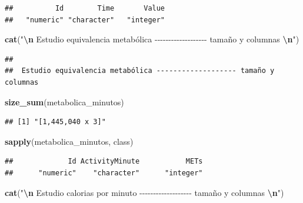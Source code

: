 \documentclass[
]{article}
\newenvironment{Shaded}{\begin{snugshade}}{\end{snugshade}}
\newcommand{\FunctionTok}[1]{\textcolor[rgb]{0.13,0.29,0.53}{\textbf{#1}}}
\newcommand{\NormalTok}[1]{#1}
\newcommand{\SpecialCharTok}[1]{\textcolor[rgb]{0.81,0.36,0.00}{\textbf{#1}}}
\newcommand{\StringTok}[1]{\textcolor[rgb]{0.31,0.60,0.02}{#1}}
\begin{document}
\begin{verbatim}
##          Id        Time       Value 
##   "numeric" "character"   "integer"
\end{verbatim}

\begin{Shaded}
\begin{Highlighting}[]
\FunctionTok{cat}\NormalTok{(}\StringTok{"}\SpecialCharTok{\textbackslash{}n}\StringTok{ Estudio equivalencia metabólica {-}{-}{-}{-}{-}{-}{-}{-}{-}{-}{-}{-}{-}{-}{-}{-}{-}{-}{-} tamaño y columnas }\SpecialCharTok{\textbackslash{}n}\StringTok{"}\NormalTok{)}
\end{Highlighting}
\end{Shaded}

\begin{verbatim}
## 
##  Estudio equivalencia metabólica ------------------- tamaño y columnas
\end{verbatim}

\begin{Shaded}
\begin{Highlighting}[]
\FunctionTok{size\_sum}\NormalTok{(metabolica\_minutos)}
\end{Highlighting}
\end{Shaded}

\begin{verbatim}
## [1] "[1,445,040 x 3]"
\end{verbatim}

\begin{Shaded}
\begin{Highlighting}[]
\FunctionTok{sapply}\NormalTok{(metabolica\_minutos, class)}
\end{Highlighting}
\end{Shaded}

\begin{verbatim}
##             Id ActivityMinute           METs 
##      "numeric"    "character"      "integer"
\end{verbatim}

\begin{Shaded}
\begin{Highlighting}[]
\FunctionTok{cat}\NormalTok{(}\StringTok{"}\SpecialCharTok{\textbackslash{}n}\StringTok{ Estudio calorias por minuto {-}{-}{-}{-}{-}{-}{-}{-}{-}{-}{-}{-}{-}{-}{-}{-}{-}{-}{-} tamaño y columnas }\SpecialCharTok{\textbackslash{}n}\StringTok{"}\NormalTok{)}
\end{Highlighting}
\end{Shaded}
\end{document}
